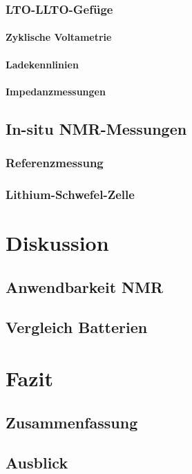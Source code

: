 \documentclass[a4paper, 11pt, headsepline,footsepline,twoside,abstract]{scrbook}
\begin{document}
\subsection{LTO-LLTO-Gefüge}
\subsubsection{Zyklische Voltametrie}
\subsubsection{Ladekennlinien}
\subsubsection{Impedanzmessungen}
\section{In-situ NMR-Messungen}
\subsection{Referenzmessung}
\subsection{Lithium-Schwefel-Zelle}
\chapter{Diskussion}
\section{Anwendbarkeit NMR}
\section{Vergleich Batterien}
\chapter{Fazit}
\section{Zusammenfassung}
\section{Ausblick}
\renewcommand{\thesection}{\Alph{section}}

\cleardoublepage
{}
\listoffigures

\cleardoublepage
{}

 

\end{document}
